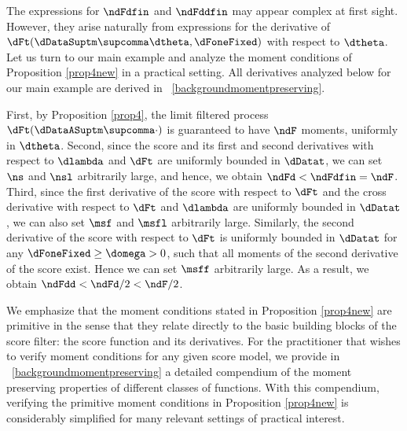 The expressions for $\ndFdfin$ and $\ndFddfin$ may appear complex at first sight.
However, they arise naturally from expressions for the derivative of $\dFt(\dDataSuptm\supcomma\dtheta,\dFoneFixed)$ with respect to $\dtheta$.
Let us turn to our main example and analyze the moment conditions of Proposition \ref{prop4new} in a practical setting. All derivatives analyzed below for our main example are derived in  \SupplementaryAppendix~\ref{backgroundmomentpreserving}.
\begin{exmc} %
First, by Proposition \ref{prop4}, the limit filtered process $\dFt(\dDataASuptm\supcomma\cdot)$ is guaranteed to have $\ndF$ moments, uniformly in $\dtheta$. Second, since the score and its first and second derivatives with respect to 
$\dlambda$ and $\dFt$  are uniformly bounded  in $\dDatat$, we can set $\ns$ and $\nsl$ arbitrarily large, and hence, we obtain $\ndFd<\ndFdfin=\ndF$.
Third, since the first derivative of the score with respect to $\dFt$ and the 
cross derivative with respect to $\dFt$ and $\dlambda$ are uniformly bounded 
in $\dDatat$, we can also set $\msf$ and $\msfl$ arbitrarily large.
Similarly, the second derivative of the score with respect to $\dFt$ is 
uniformly bounded in $\dDatat$ for any $\dFoneFixed \geq \domega>0$, such 
that all moments of the second derivative of the score exist. Hence we can set 
$\msff$ arbitrarily large.
As a result, we obtain $\ndFdd <\ndFd/2 <\ndF/2$.
\end{exmc}

We emphasize that the moment conditions stated in Proposition \ref{prop4new} are primitive in the sense that they relate directly to the basic building blocks of the score filter: the score function and its derivatives. 
For the practitioner that wishes to verify moment conditions for any given score model, we provide in \SupplementaryAppendix~\ref{backgroundmomentpreserving} a detailed  compendium of the moment preserving properties of different classes of functions. With this compendium, verifying the primitive moment conditions in Proposition \ref{prop4new} is considerably simplified for many relevant settings of practical interest.




